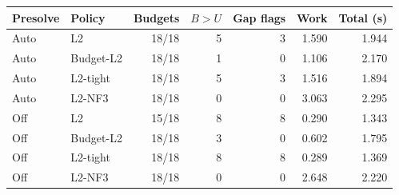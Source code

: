 \begin{tabular}{llrrrrr}
\toprule
Presolve & Policy & Budgets & $B>U$ & Gap flags & Work & Total (s)\\
\midrule
Auto & L2 & 18/18 & 5 & 3 & 1.590 & 1.944\\
Auto & Budget-L2 & 18/18 & 1 & 0 & 1.106 & 2.170\\
Auto & L2-tight & 18/18 & 5 & 3 & 1.516 & 1.894\\
Auto & L2-NF3 & 18/18 & 0 & 0 & 3.063 & 2.295\\
\midrule
Off & L2 & 15/18 & 8 & 8 & 0.290 & 1.343\\
Off & Budget-L2 & 18/18 & 3 & 0 & 0.602 & 1.795\\
Off & L2-tight & 18/18 & 8 & 8 & 0.289 & 1.369\\
Off & L2-NF3 & 18/18 & 0 & 0 & 2.648 & 2.220\\
\bottomrule
\end{tabular}

